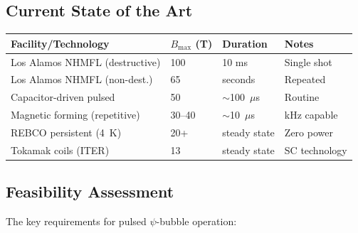 \documentclass[amsmath,amssymb,aps,prd,superscriptaddress,nofootinbib]{revtex4-2}
\begin{document}
\subsection{Current State of the Art}

\begin{center}
\begin{tabular}{llll}
\toprule
Facility/Technology & $B_\text{max}$ (T) & Duration & Notes \\
\midrule
Los Alamos NHMFL (destructive) & 100 & 10 ms & Single shot \\
Los Alamos NHMFL (non-dest.) & 65 & seconds & Repeated \\
Capacitor-driven pulsed & 50 & $\sim$100~$\mu$s & Routine \\
Magnetic forming (repetitive) & 30--40 & $\sim$10~$\mu$s & kHz capable \\
REBCO persistent (4~K) & 20+ & steady state & Zero power \\
Tokamak coils (ITER) & 13 & steady state & SC technology \\
\bottomrule
\end{tabular}
\end{center}

\subsection{Feasibility Assessment}

The key requirements for pulsed $\psi$-bubble operation:
\end{document}
